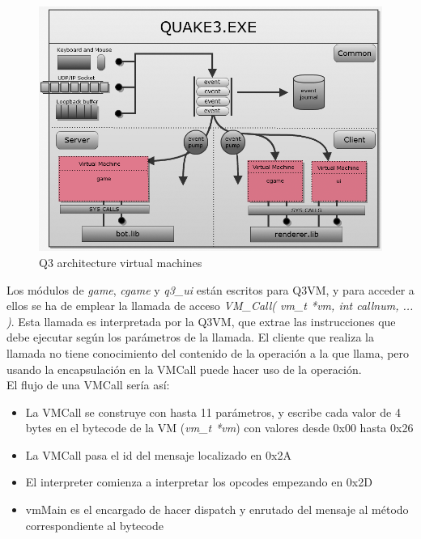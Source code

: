 \documentclass[a4paper,12pt]{report}
\begin{document}
	\begin{center}
		\begin{figure}[h]
			\includegraphics[width=1\textwidth]{images/q3_workspace_architecture}
			\caption{Q3 architecture virtual machines}
			\label{figq3vm}
		\end{figure}
	\end{center}
	
	Los módulos de \textit{game}, \textit{cgame} y \textit{q3\_ui} están escritos para Q3VM, y para acceder a ellos se ha de emplear la llamada de acceso \textit{VM\_Call( vm\_t *vm, int callnum, ... )}. Esta llamada es interpretada por la Q3VM, que extrae las instrucciones que debe ejecutar según los parámetros de la llamada. El cliente que realiza la llamada no tiene conocimiento del contenido de la operación a la que llama, pero usando la encapsulación en la VMCall puede hacer uso de la operación.\\
	
	El flujo de una VMCall sería así:
	
	\begin{itemize}  
		\item La VMCall se construye con hasta 11 parámetros, y escribe cada valor de 4 bytes en el bytecode de la VM (\textit{vm\_t *vm}) con valores desde 0x00 hasta 0x26
		\item La VMCall pasa el id del mensaje localizado en 0x2A
		\item El interpreter comienza a interpretar los opcodes empezando en 0x2D
		\item vmMain es el encargado de hacer dispatch y enrutado del mensaje al método correspondiente al bytecode
	\end{itemize}
\end{document}
